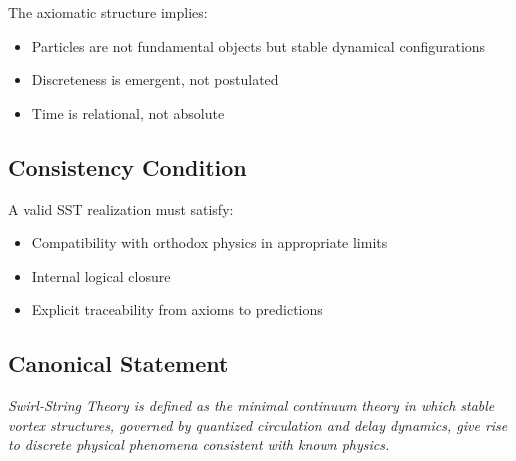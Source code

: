         The axiomatic structure implies:
        
        \begin{itemize}
            \item Particles are not fundamental objects but stable dynamical configurations
            \item Discreteness is emergent, not postulated
            \item Time is relational, not absolute
        \end{itemize}
    
    \subsection{Consistency Condition}
        
        A valid SST realization must satisfy:
        
        \begin{itemize}
            \item Compatibility with orthodox physics in appropriate limits
            \item Internal logical closure
            \item Explicit traceability from axioms to predictions
        \end{itemize}
    
    \subsection{Canonical Statement}
        
        \begin{center}
            \textit{
                Swirl-String Theory is defined as the minimal continuum theory in which stable vortex structures, governed by quantized circulation and delay dynamics, give rise to discrete physical phenomena consistent with known physics.
            }
        \end{center}